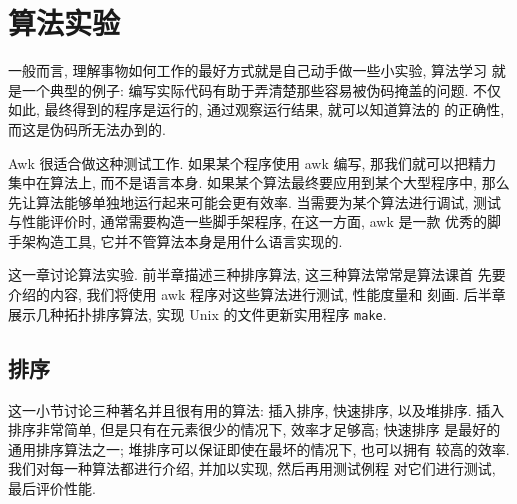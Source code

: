 \chapter{算法实验}
\label{chap:experiments_with_algorithms}

一般而言, 理解事物如何工作的最好方式就是自己动手做一些小实验, 算法学习
就是一个典型的例子: 编写实际代码有助于弄清楚那些容易被伪码掩盖的问题.
不仅如此, 最终得到的程序是运行的, 通过观察运行结果, 就可以知道算法的
的正确性, 而这是伪码所无法办到的.

Awk 很适合做这种测试工作. 如果某个程序使用 awk 编写, 那我们就可以把精力
集中在算法上, 而不是语言本身. 如果某个算法最终要应用到某个大型程序中,
那么先让算法能够单独地运行起来可能会更有效率. 当需要为某个算法进行调试,
测试与性能评价时, 通常需要构造一些脚手架程序, 在这一方面, awk 是一款
优秀的脚手架构造工具, 它并不管算法本身是用什么语言实现的.

这一章讨论算法实验. 前半章描述三种排序算法, 这三种算法常常是算法课首
先要介绍的内容, 我们将使用 awk 程序对这些算法进行测试, 性能度量和
刻画. 后半章展示几种拓扑排序算法, 实现 Unix 的文件更新实用程序
\texttt{make}.

\section{排序}
\label{sec:sorting}

这一小节讨论三种著名并且很有用的算法: 插入排序, 快速排序, 以及堆排序.
插入排序非常简单, 但是只有在元素很少的情况下, 效率才足够高; 快速排序
是最好的通用排序算法之一; 堆排序可以保证即使在最坏的情况下, 也可以拥有
较高的效率. 我们对每一种算法都进行介绍, 并加以实现, 然后再用测试例程
对它们进行测试, 最后评价性能.

